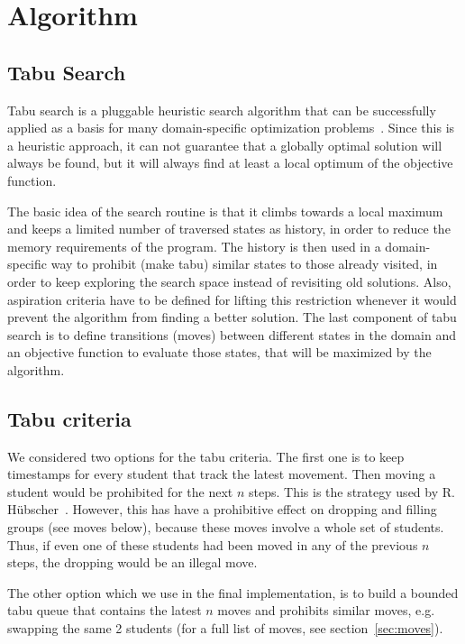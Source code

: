 \section{Algorithm}
\subsection{Tabu Search}
Tabu search is a pluggable heuristic search algorithm that can be successfully applied as a basis for many domain-specific optimization problems~\cite{glover2003handbook, glover1997tabu, hubscher2010assigning}. Since this is a heuristic approach, it can not guarantee that a globally optimal solution will always be found, but it will always find at least a local optimum of the objective function.

The basic idea of the search routine is that it climbs towards a local maximum and keeps a limited number of traversed states as history, in order to reduce the memory requirements of the program. The history is then used in a domain-specific way to prohibit (make tabu) similar states to those already visited, in order to keep exploring the search space instead of revisiting old solutions. Also, aspiration criteria have to be defined for lifting this restriction whenever it would prevent the algorithm from finding a better solution. The last component of tabu search is to define transitions (moves) between different states in the domain and an objective function to evaluate those states, that will be maximized by the algorithm.

\subsection{Tabu criteria}
We considered two options for the tabu criteria. The first one is to keep timestamps for every student that track the latest movement. Then moving a student would be prohibited for the next $n$ steps. This is the strategy used by R. H{\"u}bscher~\cite{hubscher2010assigning}. However, this has have a prohibitive effect on dropping and filling groups (see moves below), because these moves involve a whole set of students. Thus, if even one of these students had been moved in any of the previous $n$ steps, the dropping would be an illegal move.

The other option which we use in the final implementation, is to build a bounded tabu queue that contains the latest $n$ moves and prohibits similar moves, e.g. swapping the same 2 students (for a full list of moves, see section~\ref{sec:moves}).

